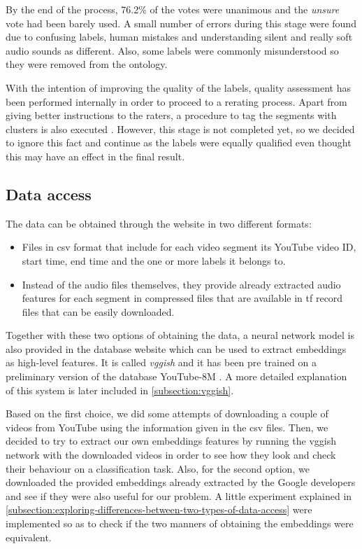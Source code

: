 	By the end of the process, 76.2\% of the votes were unanimous and the \textit{unsure} vote had been barely used. A small number of errors during this stage were found due to confusing labels, human mistakes and understanding silent and really soft audio sounds as different. Also, some labels were commonly misunderstood so they were removed from the ontology.
	
	With the intention of improving the quality of the labels, quality assessment has been performed internally in order to proceed to a rerating process. Apart from giving better instructions to the raters, a procedure to tag the segments with clusters is also executed \cite{SoundUnderstandinggroup2017}. However, this stage is not completed yet, so we decided to ignore this fact and continue as the labels were equally qualified even thought this may have an effect in the final result.

\subsection{Data access}
\label{subsection:data-access}

	The data can be obtained through the website \cite{SoundUnderstandinggroup2017} in two different formats:

	\begin{itemize}
		\item Files in \acrshort{csv} format that include for each video segment its YouTube video ID, start time, end time and the one or more labels it belongs to. 
		\item Instead of the audio files themselves, they provide already extracted audio features for each segment in compressed files that are available in \acrfull{tf} \cite{GoogleResearch2015} record files that can be easily downloaded.
	\end{itemize}
	
	Together with these two options of obtaining the data, a neural network model is also provided in the database website which can be used to extract embeddings as high-level features. It is called \textit{\acrshort{vgg}ish} \cite{Hershey2017} and it has been pre trained on a preliminary version of the database YouTube-8M \cite{Abu-El-Haija2016}. A more detailed explanation of this system is later included in \ref{subsection:vggish}.
	
	Based on the first choice, we did some attempts of downloading a couple of videos from YouTube using the information given in the \acrshort{csv} files. Then, we decided to try to extract our own embeddings features by running the \acrshort{vgg}ish network with the downloaded videos in order to see how they look and check their behaviour on a classification task. Also, for the second option, we downloaded the provided embeddings already extracted by the Google developers and see if they were also useful for our problem. A little experiment explained in \ref{subsection:exploring-differences-between-two-types-of-data-access} were implemented so as to check if the two manners of obtaining the embeddings were equivalent.

